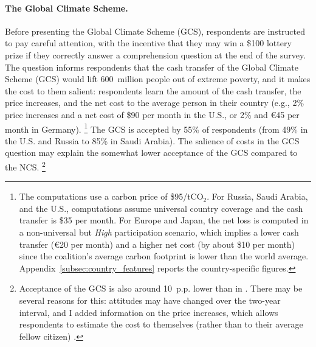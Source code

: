 \documentclass[12pt,english]{article}
\begin{document}
\paragraph{The Global Climate Scheme.} 
Before presenting the Global Climate Scheme (GCS), respondents are instructed to pay careful attention, with the incentive that they may win a \$100 lottery prize if they correctly answer a comprehension question at the end of the survey. 
The question informs respondents that the cash transfer of the Global Climate Scheme (GCS) would lift 600~million people out of extreme poverty, and it makes the cost to them salient: respondents learn the amount of the cash transfer, the price increases, and the net cost to the average person in their country (e.g., 2\% price increases and a net cost of \$90 per month in the U.S., or 2\% and \euro{}45 per month in Germany).%
\footnote{The computations use a carbon price of \$95/tCO$_\text{2}$. For Russia, Saudi Arabia, and the U.S., computations assume universal country coverage and the cash transfer is \$35 per month. 
For Europe and Japan, the net loss is computed in a non-universal but \textit{High} participation scenario, which implies a lower cash transfer (\euro{}20 per month) and a higher net cost (by about \$10 per month) since the coalition's average carbon footprint is lower than the world average. Appendix~\ref{subsec:country_features} reports the country-specific figures.} 
The GCS is accepted by 55\% of respondents (from 49\% in the U.S. and Russia to 85\% in Saudi Arabia). The salience of costs in the GCS question may explain the somewhat lower acceptance of the GCS compared to the NCS.%
\footnote{Acceptance of the GCS is also around 10~p.p. lower than in \cite{fabre_majority_2025}. There may be several reasons for this: attitudes may have changed over the two-year interval, and I added information on the price increases, which allows respondents to estimate the cost to themselves (rather than to their average fellow citizen)%
.} 

\end{document}
